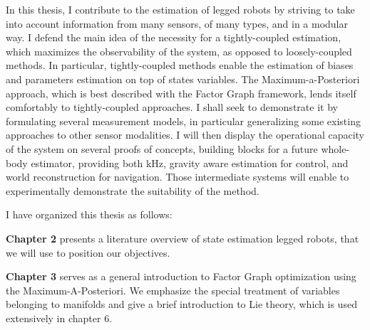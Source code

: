 In this thesis, I contribute to the estimation of legged robots by striving to take into account information from
many sensors, of many types, and in a modular way. I defend the main idea of the necessity for a tightly-coupled estimation, which maximizes the observability
of the system, as opposed to loosely-coupled methods. In particular, tightly-coupled methods enable the estimation of biases and parameters estimation
on top of states variables. The Maximum-a-Posteriori approach, which is best described with the Factor Graph framework, lends itself comfortably 
to tightly-coupled approaches. I shall seek to demonstrate it by formulating several measurement models, in particular generalizing some existing approaches to other sensor modalities.
I will then display the operational capacity of the system on several proofs of concepts, building blocks for a future whole-body estimator, providing both kHz, gravity aware
estimation for control, and world reconstruction for navigation. Those intermediate systems will enable to experimentally demonstrate the suitability of the method.




I have organized this thesis as follows:

\bigskip
\textbf{Chapter 2} presents a literature overview of state estimation legged robots, that we will use to position our objectives.

\bigskip
\textbf{Chapter 3} serves as a general introduction to Factor Graph optimization using the Maximum-A-Posteriori. We emphasize the special treatment of variables 
belonging to manifolds and give a brief introduction to Lie theory, which is used extensively in chapter 6.

